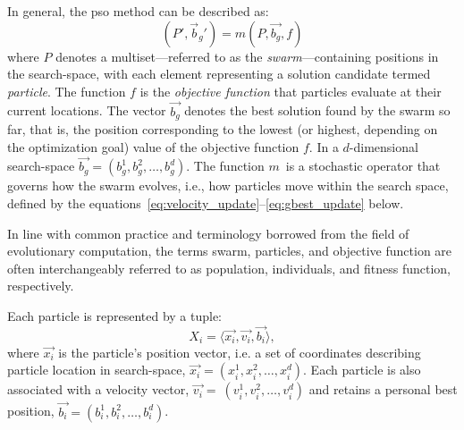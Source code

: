 {In general, the \acrfull{pso} method can be described as:
\begin{equation}\label{eq:pso}
(P', \vec{b}_g') = m(P, \vec{b_g}, f)
\end{equation}
where \(P\) denotes a multiset---referred to as the \textit{swarm}---containing positions in the \gls{search-space}, with each element representing a solution candidate termed \textit{particle}.
The function \(f\) is the \textit{objective function} that particles evaluate at their current locations.
The vector \(\vec{b_g}\) denotes the best solution found by the swarm so far, that is, the position corresponding to the lowest (or highest, depending on the optimization goal) value of the objective function \(f\).
In a \(d\)-dimensional \gls{search-space} \(\vec{b_g} = (b_{g}^{1}, b_{g}^{2}, \dots, b_{g}^{d}) \).
The function \(m\)~is a stochastic operator that governs how the swarm evolves, i.e., how particles move within the search space, defined by the equations~\eqref{eq:velocity_update}--\eqref{eq:gbest_update} below.

In line with common practice and terminology borrowed from the field of evolutionary computation, the terms swarm, particles, and objective function are often interchangeably referred to as population, individuals, and fitness function, respectively.

Each particle is represented by a tuple:
\begin{equation}\label{eq:particle}
X_i = \langle \vec{x_i}, \vec{v_{i}}, \vec{b_i} \rangle,
\end{equation}
where \(\vec{x_i}\) is the particle's position vector, i.e. a set of coordinates describing particle location in \gls{search-space},
\(\vec{x_i} = (x_{i}^{1}, x_{i}^{2}, \dots, x_{i}^{d})\). Each particle is also associated with a velocity vector, \(\vec{v_i} =\allowbreak\ (v_{i}^{1}, v_{i}^{2},\dots, v_{i}^{d})\) and retains a personal best position, 
\(\vec{b_i} = (b_{i}^{1}, b_{i}^{2}, \dots, b_{i}^{d}) \).



}
